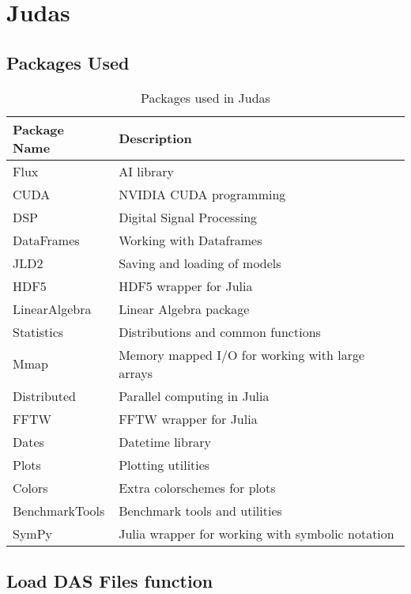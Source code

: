 \chapter{Judas}
\label{app:judas}


\section{Packages Used}
\label{app:jupacks}

\begin{table}[!h]
\centering
\caption{Packages used in Judas}
\label{tab:judas-packages}
\small
\begin{tabular}{>{\raggedright\arraybackslash}p{}>{\raggedright\arraybackslash}p{}}
\toprule
\textbf{Package Name} & \textbf{Description} \\
\midrule
\rowcolor{gray!10} Flux & AI library \\
CUDA & NVIDIA CUDA programming \\
\rowcolor{gray!10} DSP & Digital Signal Processing \\
DataFrames & Working with Dataframes \\
\rowcolor{gray!10} JLD2 & Saving and loading of models \\
HDF5 & HDF5 wrapper for Julia \\
\rowcolor{gray!10} LinearAlgebra & Linear Algebra package \\
Statistics & Distributions and common functions \\
\rowcolor{gray!10} Mmap & Memory mapped I/O for working with large arrays \\
Distributed & Parallel computing in Julia \\
\rowcolor{gray!10} FFTW & FFTW wrapper for Julia \\
Dates & Datetime library \\
\rowcolor{gray!10} Plots & Plotting utilities \\
Colors & Extra colorschemes for plots \\
\rowcolor{gray!10} BenchmarkTools & Benchmark tools and utilities \\
SymPy & Julia wrapper for working with symbolic notation \\
\bottomrule
\end{tabular}
\end{table}

\section{Load DAS Files function}
\label{app:loaddas}
%